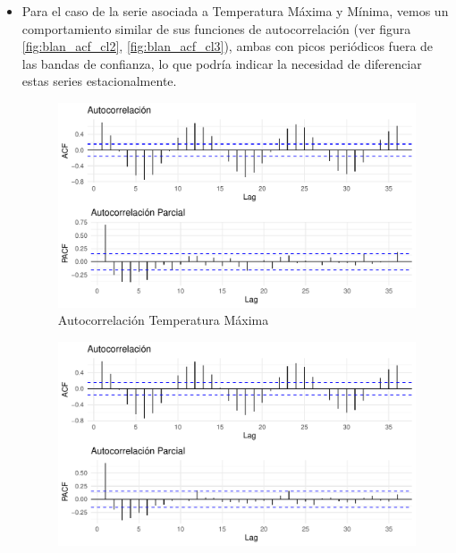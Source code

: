 \documentclass[12pt,oneside]{book}\usepackage[]{graphicx}\usepackage[]{color}
\makeatletter
\def\maxwidth{ %
  \ifdim\Gin@nat@width>\linewidth
    \linewidth
  \else
    \Gin@nat@width
  \fi
}
\newenvironment{knitrout}{}{} %
\theoremstyle{definition} %
\makeatother
\begin{document}
\begin{itemize}
\item Para el caso de la serie asociada a Temperatura Máxima y Mínima, vemos un comportamiento similar de sus funciones de autocorrelación (ver figura \ref{fig:blan_acf_cl2}, \ref{fig:blan_acf_cl3}), ambas con picos periódicos fuera de las bandas de confianza, lo que podría indicar la necesidad de diferenciar estas series estacionalmente.

\begin{knitrout}
\color{fgcolor}\begin{figure}[H]

{\centering \includegraphics[width=\maxwidth]{figure/unnamed-chunk-27-1} 

}

\caption{\label{fig:blan_acf_cl2} Autocorrelación Temperatura Máxima}\label{fig:unnamed-chunk-27}
\end{figure}


\end{knitrout}


\begin{knitrout}
\color{fgcolor}\begin{figure}[H]

{\centering \includegraphics[width=\maxwidth]{figure/unnamed-chunk-28-1} 

}
\end{figure}
\end{knitrout}
\end{itemize}
\end{document}
